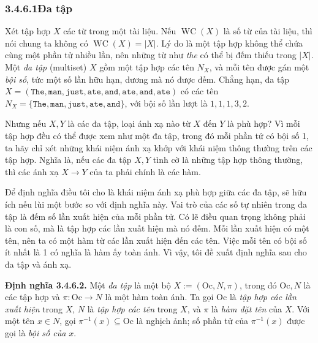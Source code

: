 \subsubsection*{3.4.6.1\quad Đa tập}
Xét tập hợp $X$ các từ trong một tài liệu. Nếu $\operatorname{WC}(X)$ là số từ của tài liệu, thì nói chung ta không có $\operatorname{WC}(X)=|X|$. Lý do là một tập hợp không thể chứa cùng một phần tử nhiều lần, nên những từ như \emph{the} có thể bị đếm thiếu trong $|X|$. Một \emph{đa tập} (multiset) $X$ gồm một tập hợp các tên $N_X$, và mỗi tên được gán một \emph{bội số}, tức một số lần hữu hạn, dương mà nó được đếm. Chẳng hạn, đa tập $X=(\texttt{The},\allowbreak\texttt{man},\allowbreak\texttt{just},\allowbreak\texttt{ate},\allowbreak\texttt{and},\allowbreak\texttt{ate},\allowbreak\texttt{and},\allowbreak\texttt{ate})$ có các tên $N_X=\{\texttt{The},\texttt{man},\texttt{just},\texttt{ate},\texttt{and}\}$, với bội số lần lượt là $1,1,1,3,2$.

Nhưng nếu $X,Y$ là các đa tập, loại ánh xạ nào từ $X$ đến $Y$ là phù hợp? Vì mỗi tập hợp đều có thể được xem như một đa tập, trong đó mỗi phần tử có bội số 1, ta hãy chỉ xét những khái niệm ánh xạ khớp với khái niệm thông thường trên các tập hợp. Nghĩa là, nếu các đa tập $X,Y$ tình cờ là những tập hợp thông thường, thì các ánh xạ $X\to Y$ của ta phải chính là các hàm.

Để định nghĩa điều tôi cho là khái niệm ánh xạ phù hợp giữa các đa tập, sẽ hữu ích nếu lùi một bước so với định nghĩa này. Vai trò của các số tự nhiên trong đa tập là đếm số lần xuất hiện của mỗi phần tử. Có lẽ điều quan trọng không phải là con số, mà là tập hợp các lần xuất hiện mà nó đếm. Mỗi lần xuất hiện có một tên, nên ta có một hàm từ các lần xuất hiện đến các tên. Việc mỗi tên có bội số ít nhất là 1 có nghĩa là hàm ấy toàn ánh. Vì vậy, tôi đề xuất định nghĩa sau cho đa tập và ánh xạ.

\noindent\textbf{Định nghĩa 3.4.6.2.} Một \emph{đa tập} là một bộ $X:=(\mathrm{Oc},N,\pi)$, trong đó $\mathrm{Oc},N$ là các tập hợp và $\pi:\mathrm{Oc}\to N$ là một hàm toàn ánh. Ta gọi $\mathrm{Oc}$ là \emph{tập hợp các lần xuất hiện} trong $X$, $N$ là \emph{tập hợp các tên} trong $X$, và $\pi$ là \emph{hàm đặt tên} của $X$. Với một tên $x\in N$, gọi $\pi^{-1}(x)\subseteq\mathrm{Oc}$ là nghịch ảnh; số phần tử của $\pi^{-1}(x)$ được gọi là \emph{bội số của $x$}.

